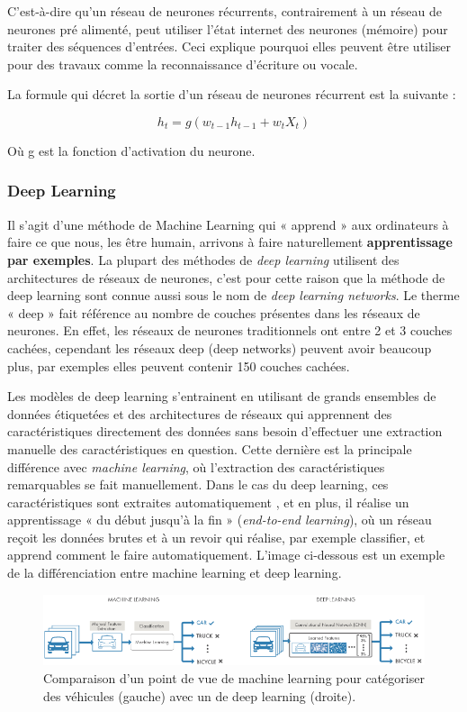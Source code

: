 \documentclass[conference,onecolumn]{IEEEtran}
\begin{document}
C’est-à-dire qu'un réseau de neurones récurrents, contrairement à un réseau de neurones pré alimenté, peut utiliser l’état internet des neurones (mémoire) pour traiter des séquences d’entrées. Ceci explique pourquoi elles peuvent être utiliser pour des travaux comme la reconnaissance d’écriture ou vocale. 

La formule qui décret la sortie d’un réseau de neurones récurrent est la suivante :

\begin{equation}
    h_t = g(w_{t-1}h_{t-1} + w_tX_t) 
\end{equation}


Où g est la fonction d’activation du neurone.  

\subsubsection{Deep Learning}
Il s’agit d’une méthode de Machine Learning qui « apprend » aux ordinateurs à faire ce que nous, les être humain, arrivons à faire naturellement \textbf{apprentissage par exemples}. La plupart des méthodes de \textit{deep learning} utilisent des architectures de réseaux de neurones, c’est pour cette raison que la méthode de deep learning sont connue aussi sous le nom de \textit{deep learning networks}. Le therme « deep » fait référence au nombre de couches présentes dans les réseaux de neurones. En effet, les réseaux de neurones traditionnels ont entre 2 et 3 couches cachées, cependant les réseaux deep (deep networks) peuvent avoir beaucoup plus, par exemples elles peuvent contenir 150 couches cachées.
\medskip

Les modèles de deep learning s’entrainent en utilisant de grands ensembles de données étiquetées et des architectures de réseaux qui apprennent des caractéristiques directement des données sans besoin d’effectuer une extraction manuelle des caractéristiques en question. Cette dernière est la principale différence avec \textit{machine learning}, où l’extraction des caractéristiques remarquables se fait manuellement. Dans le cas du deep learning, ces caractéristiques sont extraites automatiquement , et en plus, il réalise un apprentissage « du début jusqu’à la fin » (\textit{end-to-end learning}), où un réseau reçoit les données brutes et à un revoir qui réalise, par exemple classifier, et apprend comment le faire automatiquement. L’image ci-dessous est un exemple de la différenciation entre machine learning et deep learning.

 \begin{figure}[H]
 \centering
    \includegraphics[scale=0.7]{DeepLearning.png}
    \caption{Comparaison d’un point de vue de machine learning pour catégoriser des véhicules (gauche) avec un de deep learning (droite).}
\end{figure}
\end{document}
